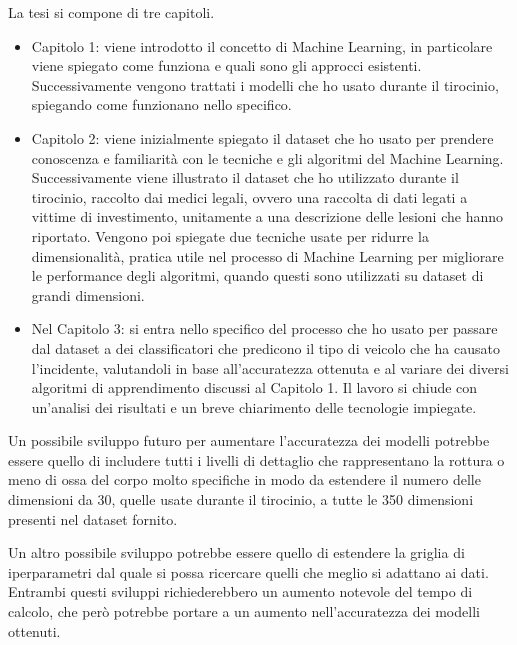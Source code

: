 \documentclass[12pt]{article}
\begin{document}
La tesi si compone di tre capitoli.
\begin{itemize}
	\item Capitolo 1: viene introdotto il concetto di Machine Learning, in particolare viene spiegato come funziona e quali sono gli approcci esistenti. Successivamente vengono trattati i modelli che ho usato durante il tirocinio, spiegando come funzionano nello specifico.
	\item Capitolo 2: viene inizialmente spiegato il dataset che ho usato per prendere conoscenza e familiarità con le tecniche e gli algoritmi del Machine Learning. Successivamente viene illustrato il dataset che ho utilizzato durante il tirocinio, raccolto dai medici legali, ovvero una raccolta di dati legati a vittime di investimento, unitamente a una descrizione delle lesioni che hanno riportato. Vengono poi spiegate due tecniche usate per ridurre la dimensionalità, pratica utile nel processo di Machine Learning per migliorare le performance degli algoritmi, quando questi sono utilizzati su dataset di grandi dimensioni.
	\item Nel Capitolo 3: si entra nello specifico del processo che ho usato per passare dal dataset a dei classificatori che predicono il tipo di veicolo che ha causato l'incidente, valutandoli in base all'accuratezza ottenuta e al variare dei diversi algoritmi di apprendimento discussi al Capitolo 1. Il lavoro si chiude con un'analisi dei risultati e un breve chiarimento delle tecnologie impiegate.
\end{itemize}
Un possibile sviluppo futuro per aumentare l'accuratezza dei modelli potrebbe essere quello di includere tutti i livelli di dettaglio che rappresentano la rottura o meno di ossa del corpo molto specifiche in modo da estendere il numero delle dimensioni da 30, quelle usate durante il tirocinio, a tutte le 350 dimensioni presenti nel dataset fornito. 

Un altro possibile sviluppo potrebbe essere quello di estendere la griglia di iperparametri dal quale si possa ricercare quelli che meglio si adattano ai dati.
Entrambi questi sviluppi richiederebbero un aumento notevole del tempo di calcolo, che però potrebbe portare a un aumento nell'accuratezza dei modelli ottenuti.
\end{document}
